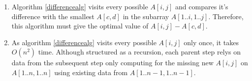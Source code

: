 \documentclass{article}
\begin{document}
\begin{enumerate}[label=(\alph*)]
\begin{algorithm}
    \end{algorithm}


    \item Algorithm \ref{differencealg} visits every possible $A[i, j]$
        and compares it's difference with the smallest $A[c,d]$ in the subarray $A[1..i, 1..j]$.
        Therefore, this algorithm must give the optimal value of $A[i, j]-A[c, d]$.
    \item As algorithm \ref{differencealg} visits every possible $A[i, j]$ only once,
        it takes $O(n^2)$ time.
        Although structured as a recursion, each parent step relys on data from the subsequent step
        only computing for the missing new $A[i, j]$ on $A[1..n, 1..n]$ using existing data from $A[1..n-1, 1..n-1]$.
\end{enumerate}
\end{document}

